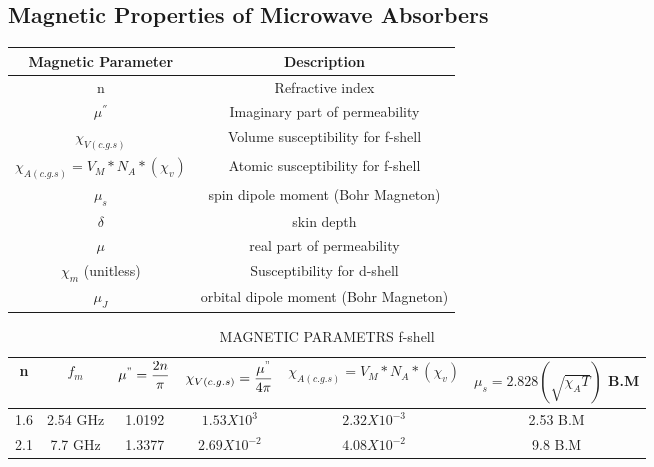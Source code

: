 \documentclass[journal]{IEEEtran}
\begin{document}
	

\subsection{Magnetic Properties of Microwave Absorbers}
\begin{longtable}{|c|c|}
		\hline
		Magnetic Parameter & Description \\
		\hline
		n & Refractive index \\
		\hline
		$\mu^{''}$ & Imaginary part of permeability \\
		\hline
	$	\chi_{V(c.g.s)}$ & Volume susceptibility for f-shell \\
	\hline
	$\chi_{A(c.g.s)}= V_M*N_A*(\chi_v)$ & Atomic susceptibility for f-shell \\
	\hline
	$\mu_s $ & spin dipole moment (Bohr Magneton) \\
	\hline
$	\delta$ & skin depth \\
\hline
$\mu$ & real part of permeability \\
\hline
$\chi_m$ (unitless) & Susceptibility for d-shell \\
\hline
$\mu_J$ & orbital dipole moment  (Bohr Magneton) \\
\hline


\end{longtable}
\begin{longtable}{|c|c|c|c|c|c|}
\caption{MAGNETIC PARAMETRS f-shell}
\label{6}
		
	
	\\
	\hline
		n & $f_m$ & $\mu^{"} = \dfrac{2 n}{\pi}$ & $\chi_{V(c.g.s)}= \dfrac{\mu^{"}}{4 \pi}$ & \small{$\chi_{A(c.g.s)}= V_M*N_A*(\chi_v)$} & $\mu_s =  2.828 (\sqrt{{\chi_A T}}) $ B.M  \\
		\hline
		1.6 & 2.54 GHz &  1.0192 & $1.53X10^{3}$ & $2.32 X 10^{-3} $ & 2.53 B.M \\
		\hline
		2.1 & 7.7 GHz  & 1.3377 & $2.69 X 10^{-2}$ & $4.08 X 10^{-2}$ & 9.8 B.M \\
		\hline
\end{longtable}
\end{document}
